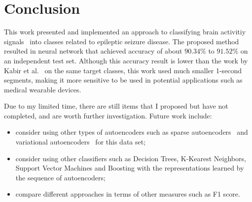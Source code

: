 \documentclass[12pt]{article}
\begin{document}
\section{Conclusion}

\noindent
This work presented and implemented an approach to classifying brain activitiy signals~\cite{andrzejak2001indications} into classes related to epileptic seizure disease. The proposed method resulted in neural network that achieved accuracy of about $90.34\%$ to $91.52\%$ on an independent test set. Although this accuracy result is lower than the work by Kabir et al.~\cite{kabir2016epileptic} on the same target classes, this work used much smaller 1-second segments, making it more sensitive to be used in potential applications such as medical wearable devices.

Due to my limited time, there are still items that I proposed but have not completed, and are worth further investigation. Future work include: 
\begin{itemize}
\item consider using other types of autoencoders such as sparse autoencoders~\cite{boureau2008sparse} and variational autoencoders~\cite{kingma2013auto} for this data set;
\item consider using other classifiers such as Decision Trees, K-Kearest Neighbors, Support Vector Machines and Boosting with the representations learned by the sequence of autoencoders;
\item compare different approaches in terms of other measures such as F1 score.
\end{itemize}




\end{document}

